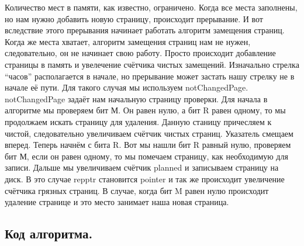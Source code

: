 Количество мест в памяти, как известно, ограничено. Когда все места заполнены, но нам нужно добавить новую страницу, происходит прерывание. И вот вследствие этого прерывания начинает работать алгоритм замещения страниц.  Когда же места хватает, алгоритм замещения страниц нам не нужен, следовательно, он не начинает свою работу. Просто происходит добавление страницы в память и увелечение счётчика чистых замещений.
Изначально стрелка “часов” располагается в начале, но прерывание может застать нашу стрелку не в начале её пути. Для такого случая мы используем notChangedPage. notChangedPage задаёт нам начальную страницу проверки. Для начала в алгоритме мы проверяем бит М. Он равен нулю, а бит R равен одному, то мы продолжаем искать страницу для удаления. Данную станицу причесляем к чистой, следовательно увеличиваем счётчик чистых страниц. Указатель смещаем вперед. Теперь начнём с бита R. Вот мы нашли бит R равный нулю, проверяем бит М, если он равен одному, то мы помечаем страницу, как необходимую для записи. Дальше мы увеличиваем счётчик planned и записываем страницу на диск. В это случае  repptr становится pointer и так же происходит увеличение счётчика грязных страниц.  В случае, когда бит M равен нулю происходит удаление странице и это место занимает наша новая страница. 

\subsection{Код алгоритма.}







